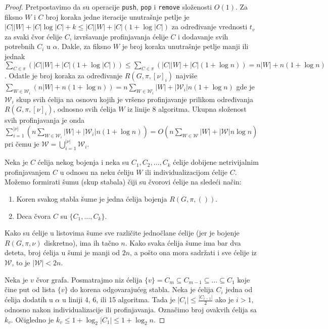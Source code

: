 \documentclass[12pt,oneside]{memoir}
\theoremstyle{definition}
\begin{document}
  \begin{proof}
	  Pretpostavimo da su operacije \texttt{push}, \texttt{pop} i
	  \texttt{remove} složenosti $O(1)$. Za fiksno $W$ i $C$ broj koraka jedne
	  iteracije unutrašnje petlje je $|C||W| + |C| \log |C| + k \leq |C||W| +
	  |C| (1 + \log |C|)$ za određivanje vrednosti $t_v$ za svaki čvor ćelije
	  $C$, izvršavanje profinjavanja ćelije $C$ i dodavanje svih potrebnih
	  $C_i$ u $\alpha$. Dakle, za fiksno $W$ je broj koraka unutrašnje petlje
	  manji ili jednak $\sum_{C \in \pi}(|C||W| + |C| (1 + \log |C|)) \leq
	  \sum_{C \in \pi}(|C||W| + |C| (1 + \log n)) = n|W| + n(1 + \log n)$.
	  Odatle je broj koraka za određivanje $R(G, \pi, [\nu]_i)$ najviše
	  $\sum_{W \in \mathcal{W}_i} (n|W| + n(1 + \log n)) = n \sum_{W \in
	  \mathcal{W}_i} |W| + |\mathcal{W}_i| n (1 + \log n)$ gde je
	  $\mathcal{W}_i$ skup svih ćelija na osnovu kojih je vršeno profinjavanje
	  prilikom određivanja $R(G, \pi, [\nu]_i)$, odnosno svih ćelija $W$ iz
	  linije 8 algoritma. Ukupna složenost svih profinjavanja je onda
	  $\sum_{i=1}^{|\nu|}(n \sum_{W \in \mathcal{W}_i} |W| + |\mathcal{W}_i| n
	  (1 + \log n)) = O(n \sum_{W \in \mathcal{W}} |W| + |\mathcal{W}| n \log
	  n)$ pri čemu je $\mathcal{W} = \bigcup_{i = 1}^{|\nu|}\mathcal{W}_i$.

	  Neka je $C$ ćelija nekog bojenja i neka su $C_1, C_2, \dots, C_k$ ćelije
	  dobijene netrivijalnim profinjavanjem $C$ u odnosu na neku ćeliju $W$ ili
	  individualizacijom ćelije $C$. Možemo formirati šumu (skup stabala) čiji
	  su čvorovi ćelije na sledeći način:
	  \begin{enumerate}
		  \item Koren svakog stabla šume je jedna ćelija bojenja $R(G, \pi, ())$.
		  \item Deca čvora $C$ su $\{C_1, \dots, C_k\}$.
	  \end{enumerate}

	  Kako su ćelije u listovima šume sve različite jednočlane ćelije (jer je
	  bojenje $R(G, \pi, \nu)$ diskretno), ima ih tačno $n$. Kako svaka ćelija
	  šume ima bar dva deteta, broj ćelija u šumi je manji od $2n$, a pošto ona
	  mora sadržati i sve ćelije iz $\mathcal{W}$, to je $|\mathcal{W}| < 2n$.

	  Neka je $v$ čvor grafa. Posmatrajmo niz ćelija $\{v\} = C_m \subseteq
	  C_{m-1} \subseteq \dots \subseteq C_1$ koje čine put od lista $\{v\}$ do
	  korena odgovarajućeg stabla. Neka je ćelija $C_i$ jedna od ćelija dodatih
	  u $\alpha$ u liniji 4, 6, ili 15 algoritma. Tada je $|C_i| \leq
	  \frac{|C_{i-1}|}{2}$ ako je $i > 1$, odnosno nakon individualizacije ili
	  profinjavanja. Označimo broj ovakvih ćelija sa $k_v$. Očigledno je $k_v
	  \leq 1 + \log_2 |C_1| \leq 1 + \log_2 n$.


\end{proof}
\end{document}
